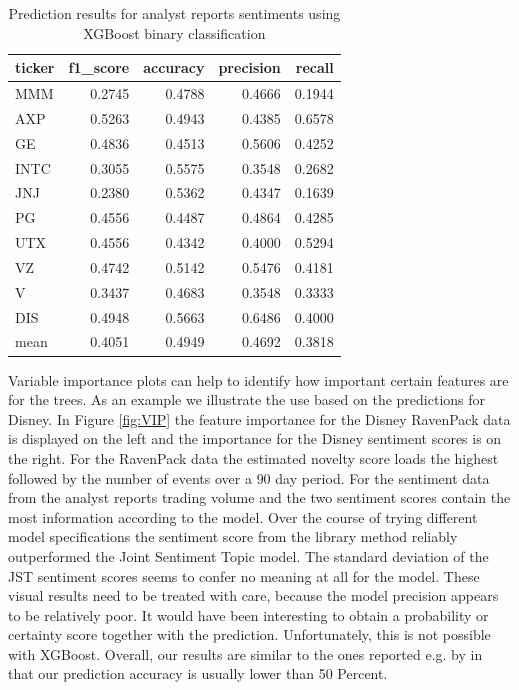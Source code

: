 \begin{table}[h]
\centering
\small
\begin{tabular}{lrrrr}
\toprule
ticker &  f1\_score &  accuracy &  precision &    recall \\
\midrule
MMM    &  0.2745 &  0.4788 &   0.4666 &  0.1944 \\
AXP    &  0.5263 &  0.4943 &   0.4385 &  0.6578 \\
GE     &  0.4836 &  0.4513 &   0.5606 &  0.4252 \\
INTC   &  0.3055 &  0.5575 &   0.3548 &  0.2682 \\
JNJ    &  0.2380 &  0.5362 &   0.4347 &  0.1639 \\
PG     &  0.4556 &  0.4487 &   0.4864 &  0.4285 \\
UTX    &  0.4556 &  0.4342 &   0.4000 &  0.5294 \\
VZ     &  0.4742 &  0.5142 &   0.5476 &  0.4181 \\
V      &  0.3437 &  0.4683 &   0.3548 &  0.3333 \\
DIS    &  0.4948 &  0.5663 &   0.6486 &  0.4000 \\
\midrule
mean &  0.4051 & 0.4949 & 0.4692 & 0.3818 \\
\bottomrule
\end{tabular}
    \caption{Prediction results for analyst reports sentiments using XGBoost binary classification}
    \label{tab:OurSentRes}
\end{table}
Variable importance plots can help to identify how important certain features are for the trees. As an example we illustrate the use based on the predictions for Disney. In Figure \ref{fig:VIP} the feature importance for the Disney RavenPack data is displayed on the left and the importance for the Disney sentiment scores is on the right. For the RavenPack data the estimated novelty score loads the highest followed by the number of events over a 90 day period. For the sentiment data from the analyst reports trading volume and the two sentiment scores contain the most information according to the model. Over the course of trying different model specifications the sentiment score from the library method reliably outperformed the Joint Sentiment Topic model. The standard deviation of the JST sentiment scores seems to confer no meaning at all for the model. These visual results need to be treated with care, because the model precision appears to be relatively poor. It would have been interesting to obtain a probability or certainty score together with the prediction. Unfortunately, this is not possible with XGBoost. Overall, our results are similar to the ones reported e.g. by \citet{atkins2018financial} in that our prediction accuracy is usually lower than 50 Percent. 

